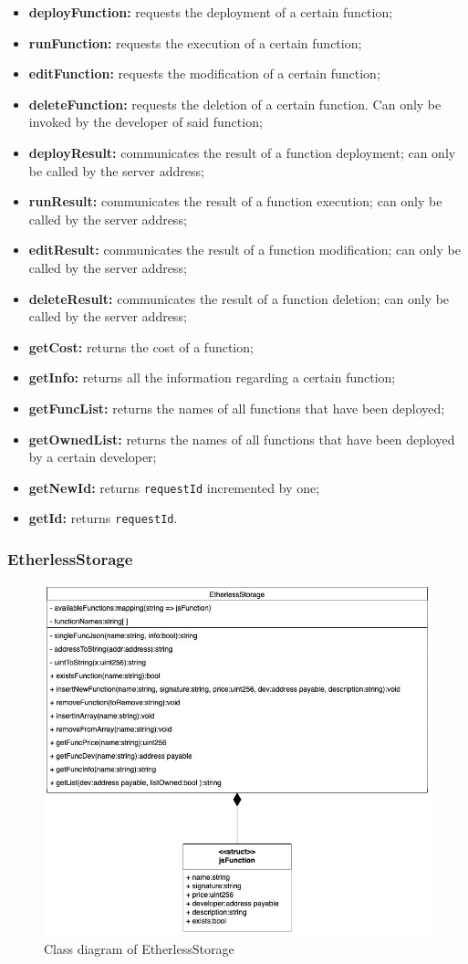 	\begin{itemize}
		\item \textbf{deployFunction:} requests the deployment of a certain function;
		\item \textbf{runFunction:} requests the execution of a certain function;
		\item \textbf{editFunction:} requests the modification of a certain function;
		\item \textbf{deleteFunction:} requests the deletion of a certain function. Can only be invoked by the developer of said function;
		\item \textbf{deployResult:} communicates the result of a function deployment; can only be called by the server address;
		\item \textbf{runResult:} communicates the result of a function execution; can only be called by the server address;
		\item \textbf{editResult:} communicates the result of a function modification; can only be called by the server address;
		\item \textbf{deleteResult:} communicates the result of a function deletion; can only be called by the server address;
		\item \textbf{getCost:} returns the cost of a function;
		\item \textbf{getInfo:} returns all the information regarding a certain function;
		\item \textbf{getFuncList:} returns the names of all functions that have been deployed;
		\item \textbf{getOwnedList:} returns the names of all functions that have been deployed by a certain developer;
		\item \textbf{getNewId:} returns \texttt{requestId} incremented by one;
		\item \textbf{getId:} returns \texttt{requestId}.
	\end{itemize}
		
\subsubsection{EtherlessStorage}
	\begin{figure}[H]
		\centering
		\includegraphics[width=0.6\linewidth]{diagrammi/etherless-smart/EtherlessStorage.jpg}
		\caption{Class diagram of EtherlessStorage}
	\end{figure}


